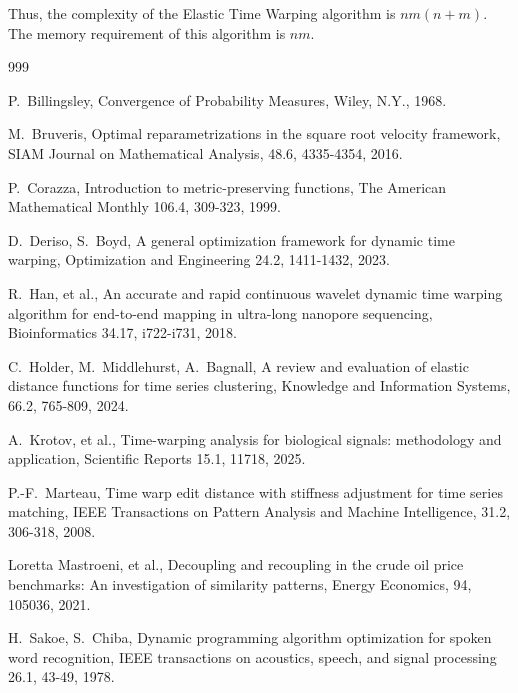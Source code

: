 \documentclass[12pt]{amsart}
\begin{document}
Thus, the complexity of the Elastic Time Warping algorithm is $n m (n+m)$.  The memory requirement of this algorithm is $n m$. 



\begin{thebibliography}{999}



P.~Billingsley, 
Convergence of Probability Measures,
 Wiley, N.Y., 1968.

M.~Bruveris, 
Optimal reparametrizations in the square root velocity framework, 
SIAM Journal on Mathematical Analysis, 48.6, 4335-4354, 2016.

P.~Corazza, 
Introduction to metric-preserving functions, 
The American Mathematical Monthly 106.4, 309-323, 1999.


D.~Deriso, S.~Boyd, 
A general optimization framework for dynamic time warping, 
Optimization and Engineering 24.2, 1411-1432, 2023.

R.~Han, et al., 
An accurate and rapid continuous wavelet dynamic time warping algorithm for end-to-end mapping in ultra-long nanopore sequencing, 
Bioinformatics 34.17, i722-i731, 2018.

C.~Holder, M.~Middlehurst, A.~Bagnall,
A review and evaluation of elastic distance functions for time series clustering, 
Knowledge and Information Systems, 66.2, 765-809, 2024.

A.~Krotov, et al., 
Time-warping analysis for biological signals: methodology and application, 
Scientific Reports 15.1, 11718, 2025.

P.-F.~Marteau, 
Time warp edit distance with stiffness adjustment for time series matching, 
IEEE Transactions on Pattern Analysis and Machine Intelligence,
31.2, 306-318, 2008.

Loretta Mastroeni, et al.,
Decoupling and recoupling in the crude oil price benchmarks: An investigation of similarity patterns,
Energy Economics, 94, 105036, 2021.

H.~Sakoe, S.~Chiba, 
Dynamic programming algorithm optimization for spoken word recognition, 
IEEE transactions on acoustics, speech, and signal processing 26.1, 43-49, 1978.


\end{thebibliography}
\end{document}
